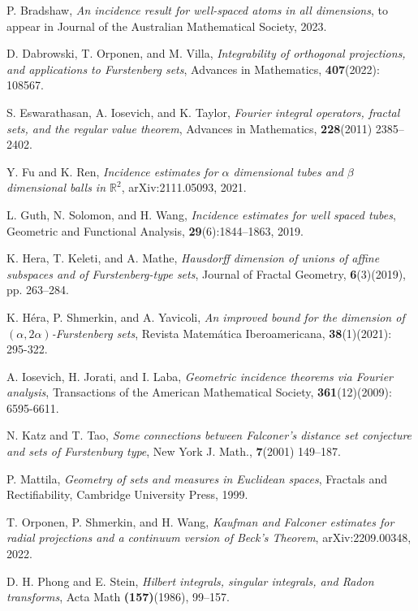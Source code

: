 \documentclass[11pt]{article}
\newcommand{\1}{\mathbf{1}}
\begin{document}
\begin{thebibliography}{}
    P. Bradshaw,\textit{ An incidence result for well-spaced atoms in all dimensions}, to appear in
    Journal of the Australian Mathematical Society, 2023.

    D. Dabrowski, T. Orponen, and M. Villa, \textit{Integrability of orthogonal projections, and applications to Furstenberg sets}, Advances in Mathematics, \textbf{407}(2022): 108567.


     S. Eswarathasan, A. Iosevich, and K. Taylor, \textit{Fourier integral operators, fractal sets,
        and the regular value theorem}, Advances in Mathematics, \textbf{228}(2011) 2385–2402.


     Y. Fu and K. Ren,  \textit{Incidence estimates for $\alpha $ dimensional tubes and $\beta$ dimensional balls in $\mathbb R^2$}, arXiv:2111.05093, 2021.



    L. Guth, N. Solomon, and H. Wang, \textit{Incidence estimates for well spaced
        tubes}, Geometric and Functional Analysis, \textbf{29}(6):1844–1863, 2019.

    K. Hera, T. Keleti, and A. Mathe, \textit{Hausdorff dimension of unions of affine subspaces and of Furstenberg-type sets}, Journal of Fractal Geometry, \textbf{6}(3)(2019), pp. 263--284.




    K. H\'{e}ra, P. Shmerkin, and A. Yavicoli, \textit{An improved bound for the dimension of $(\alpha, 2\alpha) $-Furstenberg sets}, Revista Matemática Iberoamericana, \textbf{38}(1)(2021): 295-322.


    A. Iosevich, H. Jorati, and I. Laba, \textit{Geometric incidence theorems via Fourier analysis}, Transactions of the American Mathematical Society, \textbf{361}(12)(2009): 6595-6611.


     N. Katz and T. Tao, \textit{Some connections between Falconer's distance set conjecture and sets of Furstenburg type}, New York J. Math., \textbf{7}(2001) 149--187.





    P. Mattila, \textit{Geometry of sets and measures in Euclidean spaces}, Fractals and Rectifiability, Cambridge University Press, 1999.


    T. Orponen, P. Shmerkin, and H. Wang, \textit{Kaufman and Falconer estimates for radial projections and a continuum version of Beck's Theorem}, arXiv:2209.00348, 2022.



     D. H. Phong and E. Stein, \textit{Hilbert integrals, singular integrals, and Radon transforms}, Acta Math \textbf{(157)}(1986), 99--157.









\end{thebibliography}
\end{document}
